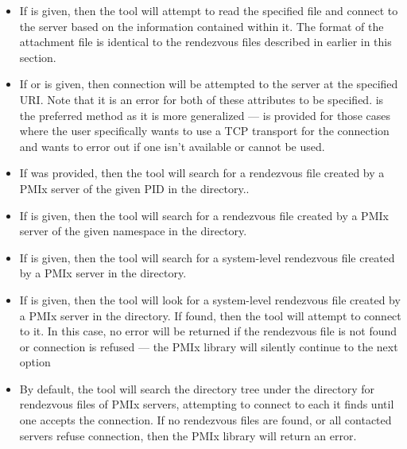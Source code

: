 \begin{itemize}

\item If  is given, then the tool will attempt to read the specified file and connect to the server based on the information contained within it. The format of the attachment file is identical to the rendezvous files described in earlier in this section.

\item If  or  is given, then connection will be attempted to the server at the specified \ac{URI}. Note that it is an error for both of these attributes to be specified.  is the preferred method as it is more generalized —  is provided for those cases where the user specifically wants to use a \ac{TCP} transport for the connection and wants to error out if one isn’t available or cannot be used.

\item If  was provided, then the tool will search for a rendezvous file created by a \ac{PMIx} server of the given \ac{PID} in the  directory..

\item If  is given, then the tool will search for a rendezvous file created by a \ac{PMIx} server of the given namespace in the  directory.

\item If  is given, then the tool will search for a system-level rendezvous file created by a \ac{PMIx} server in the  directory.

\item If  is given, then the tool will look for a system-level rendezvous file created by a \ac{PMIx} server in the  directory. If found, then the tool will attempt to connect to it. In this case, no error will be returned if the rendezvous file is not found or connection is refused — the \ac{PMIx} library will silently continue to the next option

\item By default, the tool will search the directory tree under the  directory for rendezvous files of \ac{PMIx} servers, attempting to connect to each it finds until one accepts the connection. If no rendezvous files are found, or all contacted servers refuse connection, then the \ac{PMIx} library will return an error.
\end{itemize}


